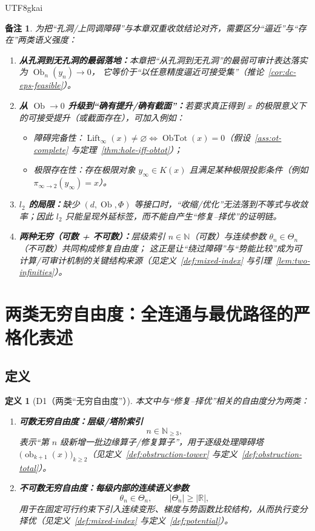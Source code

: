 \documentclass[12pt]{article}
\newtheorem{definition}{定义}[section]
\newtheorem{remark}{备注}[section]
\newcommand{\Ob}{\operatorname{Ob}}
\newcommand{\ObTot}{\operatorname{ObTot}}
\newcommand{\Lift}{\operatorname{Lift}}
\begin{document}
\begin{CJK*}{UTF8}{gkai}
\begin{remark}
为把“孔洞/上同调障碍”与本章双重收敛结论对齐，需要区分“逼近”与“存在”两类语义强度：
\begin{enumerate}
\item \textbf{从孔洞到无孔洞的最弱落地：}本章把“从孔洞到无孔洞”的最弱可审计表达落实为 $\Ob_n(y_n)\to 0$，
它等价于“以任意精度逼近可接受集”（推论~\ref{cor:dc-eps-feasible}）。
\item \textbf{从 $\Ob\to 0$ 升级到“确有提升/确有截面”：}若要求真正得到 $x$ 的极限意义下的可接受提升（或截面存在），可加入例如：
\begin{itemize}
\item 障碍完备性：$\Lift_\infty(x)\neq\varnothing \iff \ObTot(x)=0$（假设~\ref{ass:ot-complete} 与定理~\ref{thm:hole-iff-obtot}）；
\item 极限存在性：存在极限对象 $y_\infty\in K(x)$ 且满足某种极限投影条件（例如 $\pi_{\infty\to 2}(y_\infty)=x$）。
\end{itemize}
\item \textbf{$l_2$ 的局限：}缺少 $(d,\Ob,\Phi)$ 等接口时，“收缩/优化”无法落到不等式与收敛率；因此 $l_2$ 只能呈现外延标签，而不能自产生“修复--择优”的证明链。
\item \textbf{两种无穷（可数 + 不可数）：}层级索引 $n\in\mathbb N$（可数）与连续参数 $\theta_n\in\Theta_n$（不可数）共同构成修复自由度；
这正是让“绕过障碍”与“势能比较”成为可计算/可审计机制的关键结构来源（见定义~\ref{def:mixed-index} 与引理~\ref{lem:two-infinities}）。
\end{enumerate}
\end{remark}

\section{两类无穷自由度：全连通与最优路径的严格化表述}
\label{sec:two-infinities-connectivity-optimal}

\subsection{定义}

\begin{definition}[D1（两类“无穷自由度”）]\label{def:D1-two-infinities-freedom}
本文中与“修复--择优”相关的自由度分为两类：
\begin{enumerate}
\item \textbf{可数无穷自由度：层级/塔阶索引}
\[
n\in\mathbb N_{\ge3},
\]
表示“第 $n$ 级新增一批边缘算子/修复算子”，用于逐级处理障碍塔 $\bigl(\operatorname{ob}_{k+1}(x)\bigr)_{k\ge2}$（见定义~\ref{def:obstruction-tower}
  与定义~\ref{def:obstruction-total}）。
\item \textbf{不可数无穷自由度：每级内部的连续语义参数}
\[
\theta_n\in\Theta_n,\qquad |\Theta_n|\ge|\mathbb R|,
\]
用于在固定可行约束下引入连续变形、梯度与势函数比较结构，从而执行变分择优（见定义~\ref{def:mixed-index} 与定义~\ref{def:potential}）。
\end{enumerate}
\end{definition}


\end{CJK*}
\end{document}
